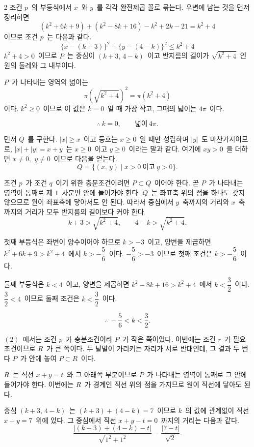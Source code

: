\documentclass[10pt,fleqn]{article}
\begin{document}
\begin{multicols*}{2}
조건 $p$\ 의 부등식에서 $x$\ 와 $y$\ 를 각각 완전제곱 꼴로 묶는다. 우변에 남는 것을 먼저 정리하면
$$(k^{2}+6k+9)+(k^{2}-8k+16)-k^{2}+2k-21=k^{2}+4$$
이므로 조건 $p$\ 는 다음과 같다.
$$\{x-(k+3)\}^{2}+\{y-(4-k)\}^{2}\le k^{2}+4$$
$k^{2}+4>0$\ 이므로 $P$\ 는 중심이 $(k+3,\,4-k)$\ 이고 반지름의 길이가 $\sqrt{k^{2}+4}$\ 인 원의 둘레와 그 내부이다.

 $P$\ 가 나타내는 영역의 넓이는
$$\pi\!\left(\sqrt{k^{2}+4}\right)^{2}=\pi(k^{2}+4)$$
이다. $k^{2}\ge 0$\ 이므로 이 값은 $k=0$\ 일 때 가장 작고, 그때의 넓이는 $4\pi$\ 이다.

$$\therefore\ k=0,\qquad \text{넓이}\ 4\pi.$$

 먼저 $Q$\ 를 구한다. $|x|\ge x$\ 이고 등호는 $x\ge 0$\ 일 때만 성립하며 $|y|$\ 도 마찬가지이므로, $|x|+|y|=x+y$\ 는 $x\ge 0$\ 이고 $y\ge 0$\ 이라는 말과 같다. 여기에 $xy>0$\ 을 더하면 $x\ne 0$,\ $y\ne 0$\ 이므로 다음을 얻는다.
$$Q=\{(x,\,y)\mid x>0\ \text{이고}\ y>0\}.$$

조건 $p$\ 가 조건 $q$\ 이기 위한 충분조건이려면 $P\subset Q$\ 이어야 한다. 곧 $P$\ 가 나타내는 영역이 통째로 제 $1$\ 사분면 안에 들어가야 한다. $Q$\ 는 좌표축 위의 점을 하나도 갖지 않으므로 원이 좌표축에 닿아서도 안 된다. 따라서 중심에서 $y$\ 축까지의 거리와 $x$\ 축까지의 거리가 모두 반지름의 길이보다 커야 한다.
$$k+3>\sqrt{k^{2}+4},\qquad 4-k>\sqrt{k^{2}+4}.$$

첫째 부등식은 좌변이 양수이어야 하므로 $k>-3$\ 이고, 양변을 제곱하면 $k^{2}+6k+9>k^{2}+4$\ 에서 $k>-\dfrac56$\ 이다. $-\dfrac56>-3$\ 이므로 첫째 조건은 $k>-\dfrac56$\ 이다.

둘째 부등식은 $k<4$\ 이고, 양변을 제곱하면 $k^{2}-8k+16>k^{2}+4$\ 에서 $k<\dfrac32$\ 이다. $\dfrac32<4$\ 이므로 둘째 조건은 $k<\dfrac32$\ 이다.

$$\therefore\ -\dfrac56<k<\dfrac32.$$

 $(2)$\ 에서는 조건 $p$\ 가 충분조건이라 $P$\ 가 작은 쪽이었다. 이번에는 조건 $r$\ 가 필요조건이므로 $R$\ 가 큰 쪽이다. 두 낱말이 가리키는 자리가 서로 반대인데, 그 결과 두 번 다 $P$\ 가 안에 놓여 $P\subset R$\ 이다.

$R$\ 는 직선 $x+y=t$\ 와 그 아래쪽 부분이므로 $P$\ 가 나타내는 영역이 통째로 그 안에 들어가야 한다. 이번에는 $R$\ 가 경계인 직선 위의 점을 가지므로 원이 직선에 닿아도 된다.

중심 $(k+3,\,4-k)$\ 는 $(k+3)+(4-k)=7$\ 이므로 $k$\ 의 값에 관계없이 직선 $x+y=7$\ 위에 있다. 그 중심에서 직선 $x+y-t=0$\ 까지의 거리는 다음과 같다.
$$\dfrac{|(k+3)+(4-k)-t|}{\sqrt{1^{2}+1^{2}}}=\dfrac{|7-t|}{\sqrt2}.$$


\end{multicols*}
\end{document}
